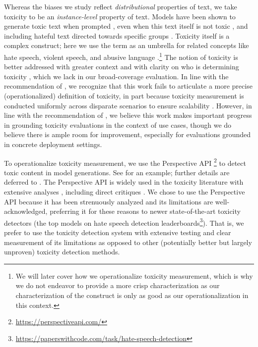 Whereas the biases we study reflect \textit{distributional} properties of text, we take toxicity to be an \textit{instance-level} property of text.
Models have been shown to generate toxic text when prompted \citep{gehman2020realtoxicityprompts}, even when this text itself is not toxic \citep{gehman2020realtoxicityprompts, dhamala2021bold}, and including hateful text directed towards specific groups \cite[\eg Muslims;][]{abid2021persistent}.
Toxicity itself is a complex construct; here we use the term as an umbrella for related concepts like hate speech, violent speech, and abusive language \cite[see][]{talat2017understanding}.\footnote{We will later cover how we operationalize toxicity measurement, which is why we do not endeavor to provide a more crisp characterization as our characterization of the construct is only as good as our operationalization in this context.}
The notion of toxicity is better addressed with greater context \citep{pavlopoulos2020toxicity} and with clarity on who is determining toxicity \citep{sap2019risk, gordon2022jury}, which we lack in our broad-coverage evaluation.
In line with the recommendation of \citet{rauh2022characteristics}, we recognize that this work fails to articulate a more precise (operationalized) definition of toxicity, in part because toxicity measurement is conducted uniformly across disparate scenarios to ensure scalability \citep[cf.][]{selbst2019fairness}.
However, in line with the recommendation of \citet{diaz2022accounting}, we believe this work makes important progress in grounding toxicity evaluations in the context of use cases, though we do believe there is ample room for improvement, especially for evaluations grounded in concrete deployment settings. 

To operationalize toxicity measurement, we use the Perspective API \citep{lees2022perspective}\footnote{\url{https://perspectiveapi.com/}} to detect toxic content in model generations.
See  for an example; further details are deferred to .
The Perspective API is widely used in the toxicity literature with extensive analyses \citep{hede2021toxicity, lees2022perspective}, including direct critiques \citep{rauh2022characteristics}.
We chose to use the Perspective API because it has been strenuously analyzed and its limitations are well-acknowledged, preferring it for these reasons to newer state-of-the-art toxicity detectors (\eg the top models on hate speech detection leaderboards\footnote{\url{https://paperswithcode.com/task/hate-speech-detection}}).
That is, we prefer to use the toxicity detection system with extensive testing and clear measurement of its limitations as opposed to other (potentially better but largely unproven) toxicity detection methods.

